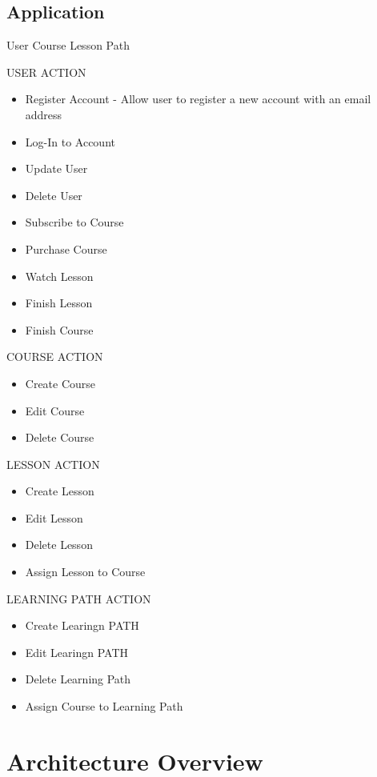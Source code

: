 \documentclass{article}
\begin{document}
\subsection[short]{Application}

User
Course
Lesson
Path

USER ACTION
\begin{itemize}
    \itemsep 0em 
    \item Register Account - Allow user to register a new account with an email address
    \item Log-In to Account
    \item Update User
    \item Delete User
    \item Subscribe to Course
    \item Purchase Course
    \item Watch Lesson
    \item Finish Lesson
    \item Finish Course    
\end{itemize}

COURSE ACTION
\begin{itemize}
    \itemsep 0em 
    \item Create Course
    \item Edit Course
    \item Delete Course
\end{itemize}

LESSON ACTION
\begin{itemize}
    \itemsep 0em 
    \item Create Lesson
    \item Edit Lesson
    \item Delete Lesson
    \item Assign Lesson to Course
\end{itemize}

LEARNING PATH ACTION
\begin{itemize}
    \itemsep 0em 
    \item Create Learingn PATH
    \item Edit Learingn PATH
    \item Delete Learning Path
    \item Assign Course to Learning Path
\end{itemize}


\section{Architecture Overview}
\end{document}
